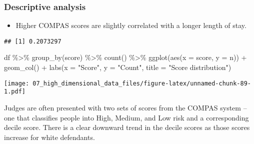 \documentclass[
]{book}
\newenvironment{Shaded}{\begin{snugshade}}{\end{snugshade}}
\newcommand{\AttributeTok}[1]{\textcolor[rgb]{0.77,0.63,0.00}{#1}}
\newcommand{\FunctionTok}[1]{\textcolor[rgb]{0.00,0.00,0.00}{#1}}
\newcommand{\NormalTok}[1]{#1}
\newcommand{\SpecialCharTok}[1]{\textcolor[rgb]{0.00,0.00,0.00}{#1}}
\newcommand{\StringTok}[1]{\textcolor[rgb]{0.31,0.60,0.02}{#1}}
\providecommand{\tightlist}{%
  \setlength{\itemsep}{0pt}\setlength{\parskip}{0pt}}
\begin{document}
\hypertarget{descriptive-analysis}{%
\subsubsection{Descriptive analysis}\label{descriptive-analysis}}

\begin{itemize}
\tightlist
\item
  Higher COMPAS scores are slightly correlated with a longer length of stay.
\end{itemize}

\begin{Shaded}
\end{Shaded}

\begin{verbatim}
## [1] 0.2073297
\end{verbatim}

\begin{Shaded}
\begin{Highlighting}[]
\NormalTok{df }\SpecialCharTok{\%\textgreater{}\%}
  \FunctionTok{group\_by}\NormalTok{(score) }\SpecialCharTok{\%\textgreater{}\%}
  \FunctionTok{count}\NormalTok{() }\SpecialCharTok{\%\textgreater{}\%}
  \FunctionTok{ggplot}\NormalTok{(}\FunctionTok{aes}\NormalTok{(}\AttributeTok{x =}\NormalTok{ score, }\AttributeTok{y =}\NormalTok{ n)) }\SpecialCharTok{+}
    \FunctionTok{geom\_col}\NormalTok{() }\SpecialCharTok{+}
    \FunctionTok{labs}\NormalTok{(}\AttributeTok{x =} \StringTok{"Score"}\NormalTok{,}
         \AttributeTok{y =} \StringTok{"Count"}\NormalTok{,}
         \AttributeTok{title =} \StringTok{"Score distribution"}\NormalTok{)}
\end{Highlighting}
\end{Shaded}

\texttt{[image: 07\_high\_dimensional\_data\_files/figure-latex/unnamed-chunk-89-1.pdf]}

Judges are often presented with two sets of scores from the COMPAS system -- one that classifies people into High, Medium, and Low risk and a corresponding decile score. There is a clear downward trend in the decile scores as those scores increase for white defendants.
\end{document}
